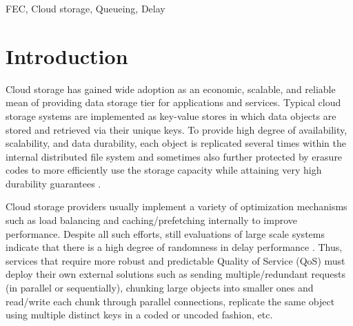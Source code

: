 \documentclass[journal]{IEEEtran}
\newcommand{\comment}[1]{}
\newcommand{\ourscheme}{TOFEC\xspace}
\begin{document}
\begin{abstract}
\comment{
\ourscheme is a strategy that helps front-end proxy adapt to different levels of workload by treating scalable cloud storage (e.g. Amazon S3) as a shared resource requiring admission control. Under light workloads, \ourscheme creates more smaller chunks and uses more parallel connections per file, minimizing service delay. Under heavy workloads, \ourscheme automatically reduces the level of chunking (fewer chunks with increased size) and uses fewer parallel connections to reduce overhead, resulting in higher throughput and preventing queueing delay. Our trace-driven simulation results show that \ourscheme's adaptation mechanism converges to an appropriate code that provides the optimal throughput-delay trade-off without reducing system capacity. Compared to a non-adaptive strategy optimized for throughput, \ourscheme delivers $2.5\times$ lower latency under light workloads; compared to a non-adaptive strategy optimized for latency, \ourscheme can scale to support over $3\times$ as many requests.
}
\end{abstract}


\begin{IEEEkeywords}
FEC, Cloud storage, Queueing, Delay
\end{IEEEkeywords}


\IEEEpeerreviewmaketitle

\section{Introduction}
\label{sec:intro}

Cloud storage has gained wide adoption as an economic, scalable, and reliable mean of providing data storage tier for applications and services. 
Typical cloud storage systems are implemented as key-value stores in which data objects are stored and retrieved via their unique keys. To provide high degree of availability, scalability, and data durability, each object is replicated several times within the internal distributed file system and sometimes also further protected by erasure codes to more efficiently use the storage capacity while attaining very high durability guarantees \cite{Huang12}. 

Cloud storage providers usually implement a variety of optimization mechanisms such as load balancing and caching/prefetching internally to improve performance. Despite all such efforts, still evaluations of large scale systems indicate that there is a high degree of randomness in delay performance \cite{Garfinkel07anevaluation}. 
Thus, services that require more robust and predictable Quality of Service (QoS) must deploy their own external solutions such as sending multiple/redundant requests (in parallel or sequentially), chunking large objects into smaller ones and read/write each chunk through parallel connections, replicate the same object using multiple distinct keys in a coded or uncoded fashion, etc.
\end{document}
